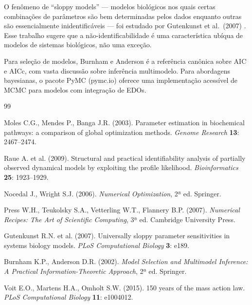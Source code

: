 O fenômeno de ``sloppy models'' --- modelos biológicos nos quais certas combinações de
parâmetros são bem determinadas pelos dados enquanto outras são essencialmente
inidentificáveis --- foi estudado por Gutenkunst et al.\ (2007) \cite{gutenkunst2007}.
Esse trabalho sugere que a não-identificabilidade é uma característica ubíqua de modelos
de sistemas biológicos, não uma exceção.

Para seleção de modelos, Burnham e Anderson \cite{burnham2002} é a referência canônica
sobre AIC e AICc, com vasta discussão sobre inferência multimodelo. Para abordagens
bayesianas, o pacote PyMC (pymc.io) oferece uma implementação acessível de MCMC para
modelos com integração de EDOs.

\begin{thebibliography}{99}

Moles C.G., Mendes P., Banga J.R. (2003).
Parameter estimation in biochemical pathways: a comparison of global optimization methods.
\textit{Genome Research} \textbf{13}: 2467--2474.

Raue A. et al. (2009).
Structural and practical identifiability analysis of partially observed dynamical models
by exploiting the profile likelihood.
\textit{Bioinformatics} \textbf{25}: 1923--1929.

Nocedal J., Wright S.J. (2006).
\textit{Numerical Optimization}, 2ª ed.
Springer.

Press W.H., Teukolsky S.A., Vetterling W.T., Flannery B.P. (2007).
\textit{Numerical Recipes: The Art of Scientific Computing}, 3ª ed.
Cambridge University Press.

Gutenkunst R.N. et al. (2007).
Universally sloppy parameter sensitivities in systems biology models.
\textit{PLoS Computational Biology} \textbf{3}: e189.

Burnham K.P., Anderson D.R. (2002).
\textit{Model Selection and Multimodel Inference: A Practical Information-Theoretic Approach},
2ª ed. Springer.

Voit E.O., Martens H.A., Omholt S.W. (2015).
150 years of the mass action law.
\textit{PLoS Computational Biology} \textbf{11}: e1004012.

\end{thebibliography}
